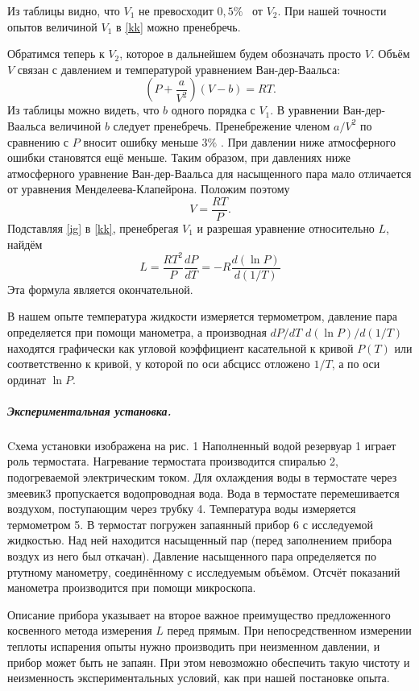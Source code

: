 \documentclass[a4paper,12pt]{article}
\begin{document}
Из таблицы видно, что $V_1$ не превосходит $0,5 \%$  от  $V_2$. При нашей точности опытов величиной $V_1$ в \eqref{kk} можно пренебречь. 

Обратимся теперь к $V_2$, которое в дальнейшем будем обозначать просто $V$. Объём $V$  связан с давлением и температурой уравнением Ван-дер-Ваальса:
\begin{equation} \label{vv}
\left(P + \dfrac{a}{V^2}\right)\left(V - b\right)= RT.
\end{equation}
Из таблицы можно видеть, что $b$ одного порядка с $V_1$. В уравнении Ван-дер-Ваальса величиной $b$ следует пренебречь. Пренебрежение членом $a/V^2$  по сравнению с $P$ вносит ошибку меньше $3\%$ . При давлении ниже атмосферного ошибки становятся ещё меньше. Таким образом, при давлениях ниже атмосферного уравнение Ван-дер-Ваальса для насыщенного пара мало отличается от уравнения Менделеева-Клапейрона. Положим поэтому
\begin{equation} \label{ig}
V = \frac{RT}{P}.
\end{equation}
Подставляя \eqref{ig} в \eqref{kk}, пренебрегая $V_1$ и разрешая уравнение относительно $L$, найдём 
\begin{equation} \label{res}
L = \frac{RT^2}{P}\frac{dP}{dT}=-R\frac{d(\ln P)}{d(1/T)}
\end{equation}
Эта формула является окончательной. 

В нашем опыте температура жидкости измеряется термометром, давление пара определяется  при помощи манометра, а производная $dP / dT$ $d(\ln P) / d(1 / T) $ находятся графически как угловой коэффициент касательной к кривой $P(T)$ или соответственно к кривой, у которой по оси абсцисс отложено $1/T$, а по оси ординат $\ln P$. 

\subparagraph*{Экспериментальная установка.} Cхема установки изображена на рис. 1 Наполненный водой резервуар 1 играет роль термостата. Нагревание термостата производится спиралью 2, подогреваемой электрическим током. Для охлаждения воды в термостате через змеевик3 пропускается водопроводная вода. Вода в термостате перемешивается воздухом, поступающим через трубку 4. Температура воды измеряется термометром 5. В термостат погружен запаянный прибор 6 с исследуемой жидкостью. Над ней находится насыщенный пар (перед заполнением прибора воздух из него был откачан). Давление насыщенного пара определяется по ртутному манометру, соединённому с исследуемым объёмом. Отсчёт показаний манометра производится при помощи микроскопа. 

Описание прибора указывает на второе важное преимущество предложенного косвенного метода измерения $L$ перед прямым. При непосредственном измерении теплоты испарения опыты нужно производить при неизменном давлении, и прибор может быть не запаян. При этом невозможно обеспечить такую чистоту и неизменность экспериментальных условий, как при нашей постановке опыта. 
\end{document}
